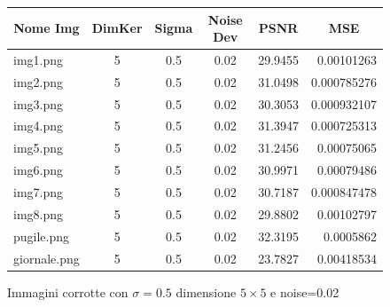 \begin{figure}[H]
\begin{minipage}[h]{\textwidth}
        \begin{tabular}{|l c c c c r|}
            \hline
            \multicolumn{1}{|c}{\textbf{Nome Img}} & \multicolumn{1}{|c}{\textbf{DimKer}} & \multicolumn{1}{|c}{\textbf{Sigma}} & \multicolumn{1}{|c}{\textbf{Noise Dev}} & \multicolumn{1}{|c}{\textbf{PSNR}} & \multicolumn{1}{|c|}{\textbf{MSE}} \\ \hline
                img1.png & 5 & 0.5 & 0.02 & 29.9455 & 0.00101263 \\
                img2.png & 5 & 0.5 & 0.02 & 31.0498 & 0.000785276\\
                img3.png & 5 & 0.5 & 0.02 & 30.3053 & 0.000932107\\
                img4.png & 5 & 0.5 & 0.02 & 31.3947 & 0.000725313\\
                img5.png & 5 & 0.5 & 0.02 & 31.2456 & 0.00075065 \\
                img6.png & 5 & 0.5 & 0.02 & 30.9971 & 0.00079486 \\
                img7.png & 5 & 0.5 & 0.02 & 30.7187 & 0.000847478\\
                img8.png & 5 & 0.5 & 0.02 & 29.8802 & 0.00102797 \\
                pugile.png & 5 & 0.5 & 0.02 & 32.3195 & 0.0005862\\
                giornale.png & 5 & 0.5 & 0.02 & 23.7827 & 0.00418534 \\ \hline
        \end{tabular}\label{tab:tabcorrotte1}
    \end{minipage}
    \captionsetup{labelformat=andtable}
    \caption{Immagini corrotte con $\sigma = 0.5$ dimensione $5 \times 5$ e noise=0.02}
\end{figure}


